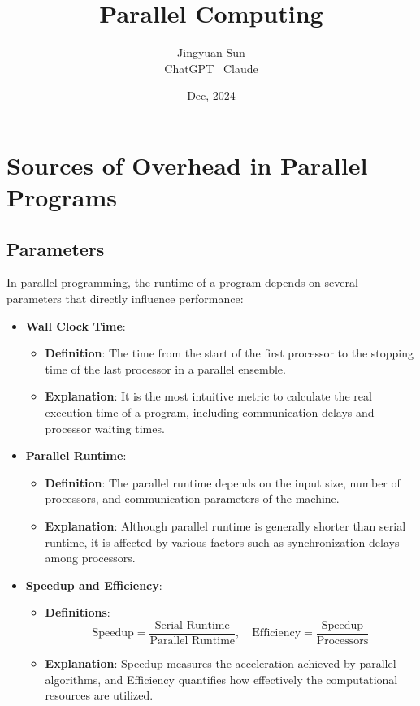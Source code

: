 \documentclass[12pt,a4paper]{article}
\title{\textbf{Parallel Computing}}
\author{Jingyuan Sun \\ ChatGPT \ Claude}
\date{Dec, 2024}
\begin{document}
\maketitle

\section{Sources of Overhead in Parallel Programs}

\subsection{Parameters}

In parallel programming, the runtime of a program depends on several parameters that directly influence performance:

\begin{itemize}
    \item \textbf{Wall Clock Time}:
    \begin{itemize}
        \item \textbf{Definition}: The time from the start of the first processor to the stopping time of the last processor in a parallel ensemble.
        \item \textbf{Explanation}: It is the most intuitive metric to calculate the real execution time of a program, including communication delays and processor waiting times.
    \end{itemize}

    \item \textbf{Parallel Runtime}:
    \begin{itemize}
        \item \textbf{Definition}: The parallel runtime depends on the input size, number of processors, and communication parameters of the machine.
        \item \textbf{Explanation}: Although parallel runtime is generally shorter than serial runtime, it is affected by various factors such as synchronization delays among processors.
    \end{itemize}

    \item \textbf{Speedup and Efficiency}:
    \begin{itemize}
        \item \textbf{Definitions}: 
        \[
        \text{Speedup} = \frac{\text{Serial Runtime}}{\text{Parallel Runtime}}, \quad \text{Efficiency} = \frac{\text{Speedup}}{\text{Processors}}
        \]
        \item \textbf{Explanation}: Speedup measures the acceleration achieved by parallel algorithms, and Efficiency quantifies how effectively the computational resources are utilized.
    \end{itemize}


\end{itemize}
\end{document}
